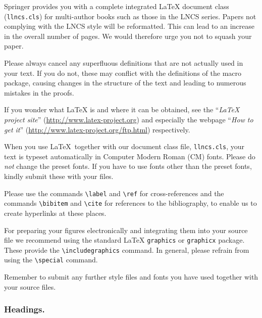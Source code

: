 \documentclass[runningheads,a4paper]{llncs}
\begin{document}

Springer provides you with a complete integrated \LaTeX{} document class
(\texttt{llncs.cls}) for multi-author books such as those in the LNCS
series. Papers not complying with the LNCS style will be reformatted.
This can lead to an increase in the overall number of pages. We would
therefore urge you not to squash your paper.

Please always cancel any superfluous definitions that are
not actually used in your text. If you do not, these may conflict with
the definitions of the macro package, causing changes in the structure
of the text and leading to numerous mistakes in the proofs.

If you wonder what \LaTeX{} is and where it can be obtained, see the
``\textit{LaTeX project site}'' (\url{http://www.latex-project.org})
and especially the webpage ``\textit{How to get it}''
(\url{http://www.latex-project.org/ftp.html}) respectively.

When you use \LaTeX\ together with our document class file,
\texttt{llncs.cls},
your text is typeset automatically in Computer Modern Roman (CM) fonts.
Please do
\emph{not} change the preset fonts. If you have to use fonts other
than the preset fonts, kindly submit these with your files.

Please use the commands \verb+\label+ and \verb+\ref+ for
cross-references and the commands \verb+\bibitem+ and \verb+\cite+ for
references to the bibliography, to enable us to create hyperlinks at
these places.

For preparing your figures electronically and integrating them into
your source file we recommend using the standard \LaTeX{} \verb+graphics+ or
\verb+graphicx+ package. These provide the \verb+\includegraphics+ command.
In general, please refrain from using the \verb+\special+ command.

Remember to submit any further style files and
fonts you have used together with your source files.

\subsubsection{Headings.}
\end{document}
